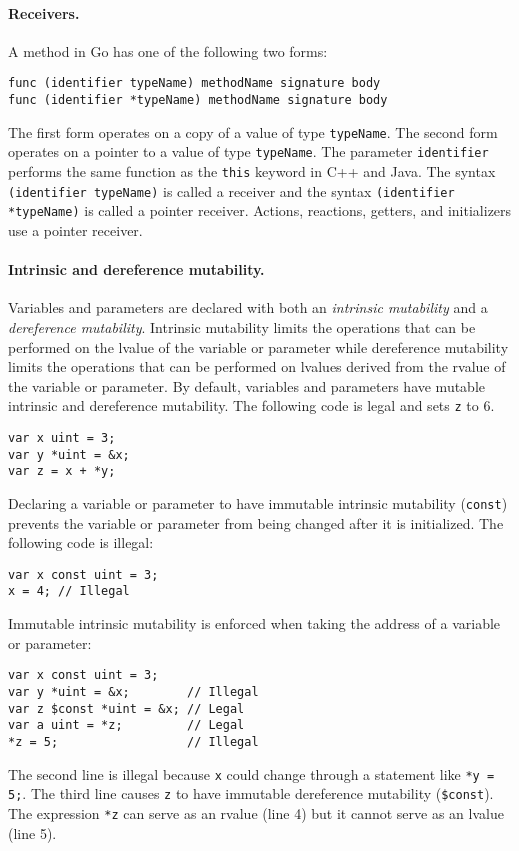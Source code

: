 \paragraph{Receivers.}
A method in Go has one of the following two forms:
\begin{verbatim}
func (identifier typeName) methodName signature body
func (identifier *typeName) methodName signature body
\end{verbatim}
The first form operates on a copy of a value of type \verb+typeName+.
The second form operates on a pointer to a value of type \verb+typeName+.
The parameter \verb+identifier+ performs the same function as the \verb+this+ keyword in C++ and Java.
The syntax \verb+(identifier typeName)+ is called a receiver and the syntax \verb+(identifier *typeName)+ is called a pointer receiver.
Actions, reactions, getters, and initializers use a pointer receiver.

\paragraph{Intrinsic and dereference mutability.}
Variables and parameters are declared with both an \emph{intrinsic mutability} and a \emph{dereference mutability}.
Intrinsic mutability limits the operations that can be performed on the lvalue of the variable or parameter while dereference mutability limits the operations that can be performed on lvalues derived from the rvalue of the variable or parameter.
By default, variables and parameters have mutable intrinsic and dereference mutability.
The following code is legal and sets \verb+z+ to 6.
\begin{verbatim}
var x uint = 3;
var y *uint = &x;
var z = x + *y;
\end{verbatim}

Declaring a variable or parameter to have immutable intrinsic mutability (\verb+const+) prevents the variable or parameter from being changed after it is initialized.
The following code is illegal:
\begin{verbatim}
var x const uint = 3;
x = 4; // Illegal
\end{verbatim}
Immutable intrinsic mutability is enforced when taking the address of a variable or parameter:
\begin{verbatim}
var x const uint = 3;
var y *uint = &x;        // Illegal
var z $const *uint = &x; // Legal
var a uint = *z;         // Legal
*z = 5;                  // Illegal
\end{verbatim}
The second line is illegal because \verb+x+ could change through a statement like \verb+*y = 5;+.
The third line causes \verb+z+ to have immutable dereference mutability (\verb|$const|).
The expression \verb+*z+ can serve as an rvalue (line 4) but it cannot serve as an lvalue (line 5).

